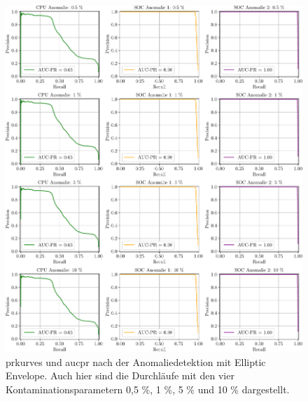 \begin{figure}[t!]
    \centering
        \includegraphics[width=1\linewidth]{ch5_anomalieerkennung/abbildungen/EE_PR_AUC_PR.pdf}
    \caption{\centering \acp*{prkurve} und \acs*{aucpr} nach der Anomaliedetektion mit Elliptic Envelope. Auch hier sind die Durchläufe mit den vier
    Kontaminationsparametern 0,5 \%, 1 \%, 5 \% und 10 \% dargestellt.}
    \label{fig:EE_AUC_PR}
\end{figure}

